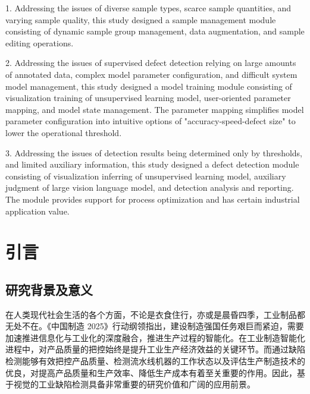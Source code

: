 \documentclass[
  ]{njuthesis}
\begin{document}
\begin{abstract*}
1. Addressing the issues of diverse sample types, scarce sample quantities, and varying sample quality, this study designed a sample management module consisting of dynamic sample group management, data augmentation, and sample editing operations.

2. Addressing the issues of supervised defect detection relying on large amounts of annotated data, complex model parameter configuration, and difficult system model management, this study designed a model training module consisting of visualization training of unsupervised learning model, user-oriented parameter mapping, and model state management. The parameter mapping simplifies model parameter configuration into intuitive options of "accuracy-speed-defect size" to lower the operational threshold.

3. Addressing the issues of detection results being determined only by thresholds, and limited auxiliary information, this study designed a defect detection module consisting of visualization inferring of unsupervised learning model, auxiliary judgment of large vision language model, and detection analysis and reporting. The module provides support for process optimization and has certain industrial application value.
\end{abstract*}

\tableofcontents
\listoffigures
\listoftables

\mainmatter

\chapter{引言}

\section{研究背景及意义}

在人类现代社会生活的各个方面，不论是衣食住行，亦或是晨昏四季，工业制品都无处不在。《中国制造 2025》行动纲领指出，建设制造强国任务艰巨而紧迫，需要加速推进信息化与工业化的深度融合，推进生产过程的智能化\cite{[1]}。在工业制造智能化进程中，对产品质量的把控始终是提升工业生产经济效益的关键环节。而通过缺陷检测能够有效把控产品质量、检测流水线机器的工作状态以及评估生产制造技术的优良，对提高产品质量和生产效率、降低生产成本有着至关重要的作用\cite{[2]}。因此，基于视觉的工业缺陷检测具备非常重要的研究价值和广阔的应用前景\cite{[1]}。
\end{document}
